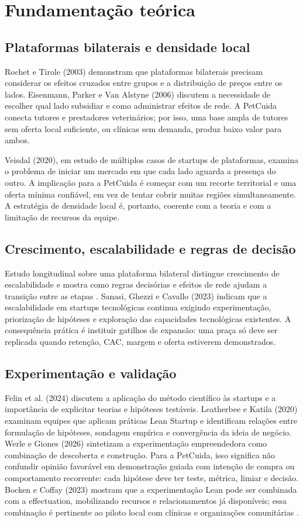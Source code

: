 \section{Fundamentação teórica}
\subsection{Plataformas bilaterais e densidade local}
Rochet e Tirole (2003) demonstram que plataformas bilaterais precisam considerar os efeitos cruzados entre grupos e a distribuição de preços entre os lados. Eisenmann, Parker e Van Alstyne (2006) discutem a necessidade de escolher qual lado subsidiar e como administrar efeitos de rede. A PetCuida conecta tutores e prestadores veterinários; por isso, uma base ampla de tutores sem oferta local suficiente, ou clínicas sem demanda, produz baixo valor para ambos.

Veisdal (2020), em estudo de múltiplos casos de startups de plataformas, examina o problema de iniciar um mercado em que cada lado aguarda a presença do outro. A implicação para a PetCuida é começar com um recorte territorial e uma oferta mínima confiável, em vez de tentar cobrir muitas regiões simultaneamente. A estratégia de densidade local é, portanto, coerente com a teoria e com a limitação de recursos da equipe.

\subsection{Crescimento, escalabilidade e regras de decisão}
Estudo longitudinal sobre uma plataforma bilateral distingue crescimento de escalabilidade e mostra como regras decisórias e efeitos de rede ajudam a transição entre as etapas \cite{platformscaling2023}. Sanasi, Ghezzi e Cavallo (2023) indicam que a escalabilidade em startups tecnológicas continua exigindo experimentação, priorização de hipóteses e exploração das capacidades tecnológicas existentes. A consequência prática é instituir gatilhos de expansão: uma praça só deve ser replicada quando retenção, CAC, margem e oferta estiverem demonstrados.

\subsection{Experimentação e validação}
Felin et al. (2024) discutem a aplicação do método científico às startups e a importância de explicitar teorias e hipóteses testáveis. Leatherbee e Katila (2020) examinam equipes que aplicam práticas Lean Startup e identificam relações entre formulação de hipóteses, sondagem empírica e convergência da ideia de negócio. Werle e Giones (2026) sintetizam a experimentação empreendedora como combinação de descoberta e construção. Para a PetCuida, isso significa não confundir opinião favorável em demonstração guiada com intenção de compra ou comportamento recorrente: cada hipótese deve ter teste, métrica, limiar e decisão. Bocken e Coffay (2023) mostram que a experimentação Lean pode ser combinada com a effectuation, mobilizando recursos e relacionamentos já disponíveis; essa combinação é pertinente ao piloto local com clínicas e organizações comunitárias \cite{bocken2023}.


